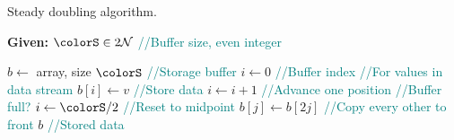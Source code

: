 \begin{algorithm}[H]
\caption{Steady doubling algorithm.}
\label{alg:steady-doubling}
\begin{minipage}{0.5\textwidth}
    \hspace*{\algorithmicindent} \textbf{Given:} $\colorS \in 2\mathcal{N}$ \textcolor{teal}{\small//Buffer size, even integer}
    \hspace*{\algorithmicindent}    \begin{algorithmic}[1]
        \State $b \gets$ array, size $\colorS$ \textcolor{teal}{\small//Storage buffer}
        \State $i \gets 0$ \textcolor{teal}{\small//Buffer index}
         \textcolor{teal}{\small//For values in data stream}
        \State $b[i] \gets v$ \textcolor{teal}{\small//Store data}
        \State $i \gets i + 1$  \textcolor{teal}{\small//Advance one position}
         \textcolor{teal}{\small//Buffer full?}
        \State $i \gets \colorS / 2$ \textcolor{teal}{\small//Reset to midpoint}
        \For{$j \in [0\twodots \colorS/2)$}
        \State $b[j] \gets b[2j]$ \textcolor{teal}{\small//Copy every other to front}
        \EndFor
        \EndIf
        \EndFor
        \Return $b$ \textcolor{teal}{\small//Stored data}
    \end{algorithmic}
\end{minipage}
\end{algorithm}
